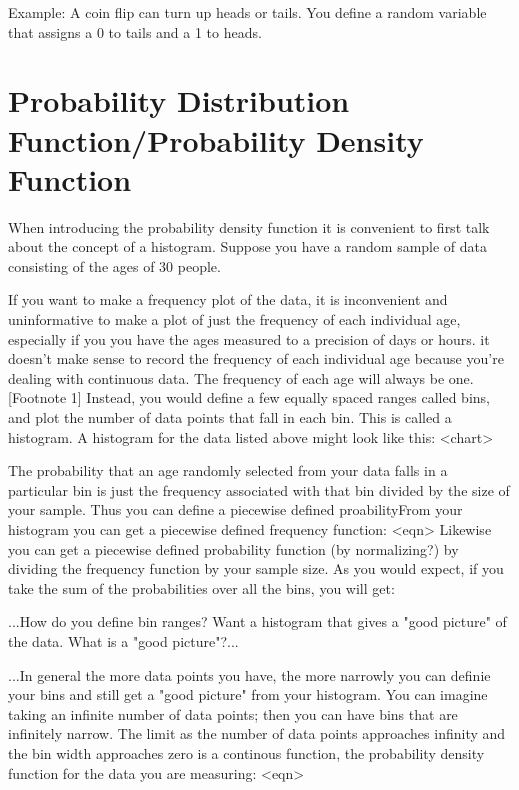 \documentclass{article}
\begin{document}
Example:   A coin flip can turn up heads or tails.  You define a random variable that assigns a 0 to tails and a 1 to heads.


\section{Probability Distribution Function/Probability Density Function}

When introducing the probability density function it is convenient to first talk about the concept of a histogram.  Suppose you have a random sample of data consisting of the ages of 30 people. 


If you want to make a frequency plot of the data, it is inconvenient and uninformative to make a plot of just the frequency of each individual age, especially if you you have the ages measured to a precision of days or hours.  it doesn't make sense to record the frequency of each individual age because you're dealing with continuous data.  The frequency of each age will always be one. [Footnote 1]  Instead, you would define a few equally spaced ranges called bins, and plot the number of data points that fall in each bin.  This is called a histogram.  A histogram for the data listed above might look like this:  <chart>


The probability that an age randomly selected from your data falls in a particular bin is just the frequency associated with that bin divided by the size of your sample.  Thus you can define a piecewise defined proabilityFrom your histogram you can get a piecewise defined frequency function:  <eqn>  Likewise you can get a piecewise defined probability function (by normalizing?) by dividing the frequency function by your sample size. As you would expect, if you take the sum of the probabilities over all the bins, you will get: %


...How do you define bin ranges? Want a histogram that gives a "good picture" of the data.  What is a "good picture"?...


...In general the more data points you have, the more narrowly you can definie your bins and still get a "good picture" from your histogram.  You can imagine taking an infinite number of data points; then you can have bins that are infinitely narrow.  The limit as the number of data points approaches infinity and the bin width approaches zero is a continous function, the probability density function for the data you are measuring: <eqn>
\end{document}
